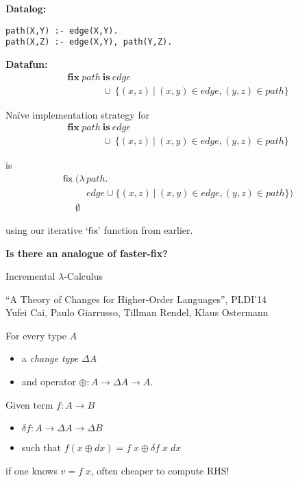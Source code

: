 \documentclass[dvipsnames]{beamer}
\newcommand{\mb}{\mathbf}
\newcommand{\setfor}[2]{\{#1 ~|~ #2\}}
\begin{document}
\begin{frame}[fragile]
  \Large\textbf{Datalog:}
\begin{verbatim}
path(X,Y) :- edge(X,Y).
path(X,Z) :- edge(X,Y), path(Y,Z).
\end{verbatim}
\vspace{0.4cm}

\Large\textbf{Datafun:}
  \[
  \begin{array}{l}
    \mb{fix}~path~\mb{is}~edge\\
    \phantom{\mb{fix}~path}\,\cup~\setfor{(x,z)}{(x,y) \in edge, (y,z) \in path}
  \end{array}
  \]
\end{frame}


\begin{frame}
  \Large
  Na\"ive implementation strategy for
  \[
  \begin{array}{l}
    \mb{fix}~path~\mb{is}~edge\\
    \phantom{\mb{fix}~path}\,\cup~\setfor{(x,z)}{(x,y) \in edge, (y,z) \in path}
  \end{array}
  \]

  is
  \[
  \begin{array}{l}
    \textsf{fix}\; (\lambda\, path.\\
    \phantom{\textsf{fix}\; (\lambda\, } edge \cup \setfor{(x,z)}{(x,y) \in edge, (y,z) \in path})
    \\ \phantom{\textsf{fix}\;}\emptyset
  \end{array}
  \]

  using our iterative `$\mathsf{fix}$' function from earlier.
  \vspace{1em}

  \textbf{Is there an analogue of {\normalfont faster-fix}?}
\end{frame}


\begin{frame}
  \Huge \centering
  Incremental $\lambda$-Calculus\vspace{0.5cm}

  \large ``A Theory of Changes for Higher-Order Languages'', PLDI'14\\Yufei
  Cai, Paulo Giarrusso, Tillman Rendel, Klaus Ostermann
\end{frame}

\begin{frame}
  \Large For every type $A$
  \begin{itemize}
  \item a \emph{change type} $\Delta A$ 
  \item and operator $\oplus : A \to \Delta A \to A$.
  \end{itemize}
  \vspace{0.5cm}

  Given term $f : A \to B$\\
  \begin{itemize}
  \item $\delta f : A \to \Delta A \to \Delta B$
  \item such that $f(x \oplus dx) = f\; x \oplus \delta f\; x\; dx$
  \end{itemize}
  if one knows $v = f\; x$, often cheaper to compute RHS!
\end{frame}
\end{document}
